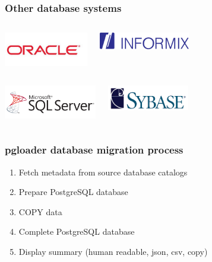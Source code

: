 \documentclass{beamer}
\begin{document}
\begin{frame}
  \frametitle{Other database systems}

  \begin{columns}[c]
    \begin{center}
      \includegraphics[height=4em]{oracle-logo.png}
    \end{center}
    \begin{center}
      \includegraphics[height=2em]{Informix_d1323_450x450.png}
    \end{center}
  \end{columns}
  \vfill

  \begin{columns}[c]
    \begin{center}
      \includegraphics[height=4em]{mssql.png}
    \end{center}
    \begin{center}
      \includegraphics[height=3em]{sybase_logo.png}
    \end{center}
  \end{columns}
\end{frame}

\begin{frame}[fragile]
  \frametitle{pgloader database migration process}

  \vfill
  
  \begin{enumerate}
  \item Fetch metadata from source database catalogs
  \item Prepare PostgreSQL database
  \item COPY data
  \item Complete PostgreSQL database
  \item Display summary (human readable, json, csv, copy)
  \end{enumerate}
\end{frame}
\end{document}
